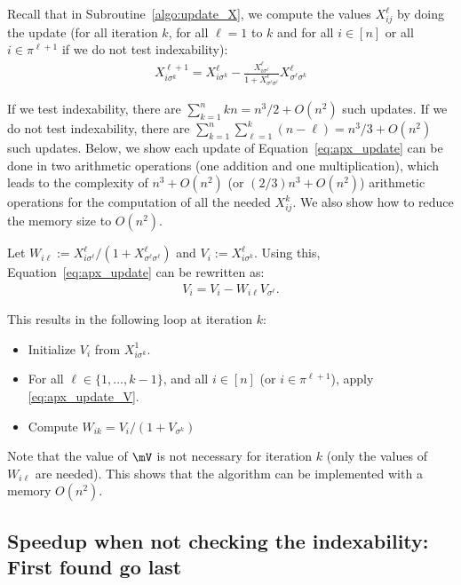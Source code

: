 Recall that in Subroutine~\ref{algo:update_X}, we compute the values $X^{\ell}_{ij}$ by doing the update (for all iteration $k$, for all $\ell=1$ to $k$ and for all $i\in[n]$ or all $i\in\pi^{\ell+1}$ if we do not test indexability):
\begin{align}
    \label{eq:apx_update}
    X_{i\sigma^{k}}^{\ell+1} = X_{i\sigma^{k}}^{\ell} -\displaystyle\frac{X^{\ell}_{i\sigma^{\ell}}}{1+X^{\ell}_{\sigma^{\ell}\sigma^{\ell}}}X^{\ell}_{\sigma^{\ell}\sigma^{k}}
\end{align}

If we test indexability, there are $\sum_{k=1}^nk n = n^3/2+O(n^2)$ such updates. If we do not test indexability, there are $\sum_{k=1}^n \sum_{\ell=1}^k (n-\ell) = n^3/3 + O(n^2)$ such updates.  Below, we show each update of Equation~\eqref{eq:apx_update} can be done in two arithmetic operations (one addition and one multiplication), which leads to the complexity of $n^3+O(n^2)$ (or $(2/3)n^3+O(n^2)$) arithmetic operations for the computation of all the needed $X^k_{ij}$.  We also show how to reduce the memory size to $O(n^2)$.

Let $W_{i\ell} := X^\ell_{i \sigma^\ell}/(1+X^\ell_{\sigma^\ell\sigma^\ell})$ and $V_i :=X^\ell_{i\sigma^k}$. Using this, Equation~\eqref{eq:apx_update} can be rewritten as: 
\begin{align}
    \label{eq:apx_update_V}
    V_{i} = V_{i} - W_{i\ell} V_{\sigma^{\ell}}.
\end{align}

This results in the following loop at iteration $k$:
\begin{itemize}
    \item Initialize $V_{i}$ from $X^1_{i\sigma^k}$. 
    \item For all $\ell\in\{1,\dots, k-1\}$, and all $i\in[n]$ (or $i\in\pi^{\ell+1}$), apply \eqref{eq:apx_update_V}. 
    \item Compute $W_{ik}= V_{i}/(1+V_{\sigma^k})$
\end{itemize}
Note that the value of $\mV$ is not necessary for iteration $k$ (only the values of $W_{i\ell}$ are needed). This shows that the algorithm can be implemented with a memory $O(n^2)$.%

\subsection{Speedup when not checking the indexability: First found go last} 

